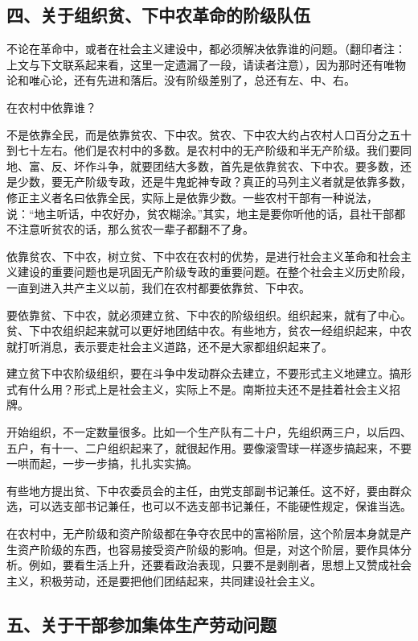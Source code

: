 \subsection{四、关于组织贫、下中农革命的阶级队伍}

不论在革命中，或者在社会主义建设中，都必须解决依靠谁的问题。（翻印者注：上文与下文联系起来看，这里一定遗漏了一段，请读者注意），因为那时还有唯物论和唯心论，还有先进和落后。没有阶级差别了，总还有左、中、右。

在农村中依靠谁？

不是依靠全民，而是依靠贫农、下中农。贫农、下中农大约占农村人口百分之五十到七十左右。他们是农村中的多数。是农村中的无产阶级和半无产阶级。我们要同地、富、反、坏作斗争，就要团结大多数，首先是依靠贫农、下中农。要多数，还是少数，要无产阶级专政，还是牛鬼蛇神专政？真正的马列主义者就是依靠多数，修正主义者名曰依靠全民，实际上是依靠少数。一些农村干部有一种说法，说：“地主听话，中农好办，贫农糊涂。”其实，地主是要你听他的话，县社干部都不注意听贫农的话，那么贫农一辈子都翻不了身。

依靠贫农、下中农，树立贫、下中农在农村的优势，是进行社会主义革命和社会主义建设的重要问题也是巩固无产阶级专政的重要问题。在整个社会主义历史阶段，一直到进入共产主义以前，我们在农村都要依靠贫、下中农。

要依靠贫、下中农，就必须建立贫、下中农的阶级组织。组织起来，就有了中心。贫、下中农组织起来就可以更好地团结中农。有些地方，贫农一经组织起来，中农就打听消息，表示要走社会主义道路，还不是大家都组织起来了。

建立贫下中农阶级组织，要在斗争中发动群众去建立，不要形式主义地建立。搞形式有什么用？形式上是社会主义，实际上不是。南斯拉夫还不是挂着社会主义招牌。

开始组织，不一定数量很多。比如一个生产队有二十户，先组织两三户，以后四、五户，有十一、二户组织起来了，就很起作用。要像滚雪球一样逐步搞起来，不要一哄而起，一步一步搞，扎扎实实搞。

有些地方提出贫、下中农委员会的主任，由党支部副书记兼任。这不好，要由群众选，可以选支部书记兼任，也可以不选支部书记兼任，不能硬性规定，保谁当选。

在农村中，无产阶级和资产阶级都在争夺农民中的富裕阶层，这个阶层本身就是产生资产阶级的东西，也容易接受资产阶级的影响。但是，对这个阶层，要作具体分析。例如，要看生活上升，还要看政治表现，只要不是剥削者，思想上又赞成社会主义，积极劳动，还是要把他们团结起来，共同建设社会主义。

\subsection{五、关于干部参加集体生产劳动问题}

